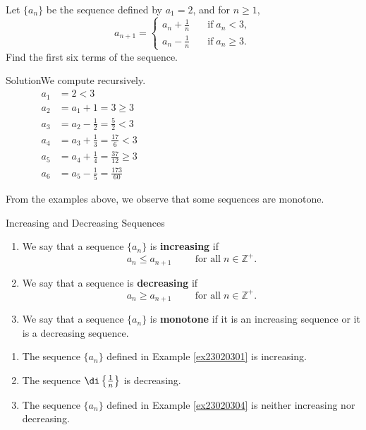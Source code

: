 \begin{example}[label=ex23020304]{}
Let $\{a_n\}$ be the sequence defined by $a_1=2$, and for $n\geq 1$,
\[a_{n+1}=\begin{cases} a_n+\frac{1}{n}\quad &\text{if}\;a_n<3,\\a_n-\frac{1}{n}\quad &\text{if}\;a_n\geq 3.\end{cases}\]
Find the first six terms of the sequence.
\end{example}
\begin{solution}{Solution}We compute recursively.
\begin{align*}
a_1&=2<3\\
a_2&= a_1+1=3\geq 3 \\
a_3&=a_2-\frac{1}{2}=\frac{5}{2}<3\\
a_4&=a_3+\frac{1}{3}=\frac{17}{6}<3\\
a_5&=a_4+\frac{1}{4}=\frac{37}{12}\geq 3\hspace{8cm}
\\
a_6&=a_5-\frac{1}{5}=\frac{173}{60}
\end{align*}
\end{solution}


From the examples above, we observe that some sequences are monotone. 

\begin{definition}{Increasing and Decreasing Sequences}
\begin{enumerate}[1.]
\item
We say that a sequence $\{a_n\}$ is {\bf increasing} if
\[a_n\leq a_{n+1}\hspace{1cm}\text{for all}\;n\in\mathbb{Z}^+.\]
\item We say that a sequence is {\bf decreasing} if 
\[a_n\geq a_{n+1}\hspace{1cm}\text{for all}\;n\in\mathbb{Z}^+.\]
\item We say that a sequence $\{a_n\}$ is {\bf monotone} if it is an increasing sequence or it is a decreasing sequence.
\end{enumerate}
\end{definition}

\begin{example}{}
\begin{enumerate}[1.]
\item The sequence  $\{a_n\}$ defined in Example \ref{ex23020301} is increasing.
\item The sequence $\di\left\{\frac{1}{n}\right\}$ is decreasing.
\item The sequence  $\{a_n\}$ defined in Example \ref{ex23020304} is neither increasing nor decreasing.

\end{enumerate}
\end{example}

